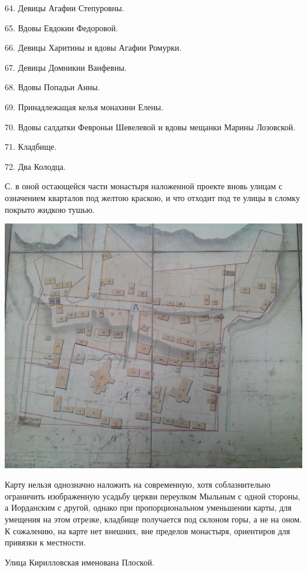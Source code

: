 64. Девицы Агафии Степуровны.

65. Вдовы Евдокии Федоровой.

66. Девицы Харитины и вдовы Агафии Ромурки.

67. Девицы Домникии Ванфевны.

68. Вдовы Попадьи Анны.

69. Принадлежащая келья монахини Елены.

70. Вдовы салдатки Февроньи Шевелевой и вдовы мещанки Марины Лозовской.

71. Кладбище.

72. Два Колодца.

С. в оной остающейся части монастыря наложенной проекте вновь улицам с означением кварталов под желтою краскою, и что отходит под те улицы в сломку покрыто жидкою тушью.

\begin{center}
\includegraphics[width=\linewidth]{chast-kirvys/iordanruch/IMG_20170627_142118.jpg}
\end{center}

Карту нельзя однозначно наложить на современную, хотя соблазнительно ограничить изображенную усадьбу церкви переулком Мыльным с одной стороны, а Иорданским с другой, однако при пропорциональном уменьшении карты, для умещения на этом отрезке, кладбище получается под склоном горы, а не на оном. К сожалению, на карте нет внешних, вне пределов монастыря, ориентиров для привязки к местности.

Улица Кирилловская именована Плоской.

